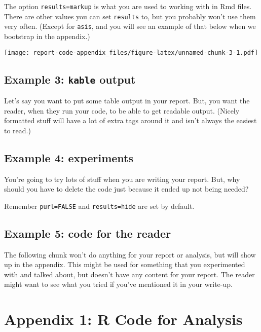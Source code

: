 \documentclass[
]{article}
\begin{document}
The option \texttt{results=\textquotesingle{}markup\textquotesingle{}}
is what you are used to working with in Rmd files. There are other
values you can set \texttt{results} to, but you probably won't use them
very often. (Except for \texttt{asis}, and you will see an example of
that below when we bootstrap in the appendix.)

\texttt{[image: report-code-appendix\_files/figure-latex/unnamed-chunk-3-1.pdf]}

\hypertarget{example-3-kable-output}{%
\subsection{\texorpdfstring{Example 3: \texttt{kable}
output}{Example 3: kable output}}\label{example-3-kable-output}}

Let's say you want to put some table output in your report. But, you
want the reader, when they run your code, to be able to get readable
output. (Nicely formatted stuff will have a lot of extra tags around it
and isn't always the easiest to read.)

\hypertarget{example-4-experiments}{%
\subsection{Example 4: experiments}\label{example-4-experiments}}

You're going to try lots of stuff when you are writing your report. But,
why should you have to delete the code just because it ended up not
being needed?

Remember \texttt{purl=FALSE} and
\texttt{results=\textquotesingle{}hide\textquotesingle{}} are set by
default.

\hypertarget{example-5-code-for-the-reader}{%
\subsection{Example 5: code for the
reader}\label{example-5-code-for-the-reader}}

The following chunk won't do anything for your report or analysis, but
will show up in the appendix. This might be used for something that you
experimented with and talked about, but doesn't have any content for
your report. The reader might want to see what you tried if you've
mentioned it in your write-up.

\newpage

\hypertarget{appendix-1-r-code-for-analysis}{%
\section{Appendix 1: R Code for
Analysis}\label{appendix-1-r-code-for-analysis}}
\end{document}
